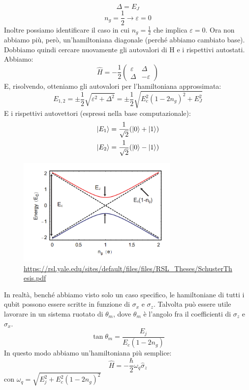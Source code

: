 \begin{equation*}
    \Delta = E_J
\end{equation*}
\begin{equation*}
    n_g=\frac{1}{2} \rightarrow \varepsilon=0
\end{equation*}
Inoltre possiamo identificare il caso in cui $n_g = \frac{1}{2}$ che implica $\varepsilon=0$.
Ora non abbiamo più, però, un'hamiltoniana diagonale (perché abbiamo cambiato base). Dobbiamo quindi cercare nuovamente gli autovalori di H e i rispettivi autostati.
Abbiamo:
\begin{equation*}
    \hat H=-\frac{1}{2}\begin{pmatrix} \varepsilon & \Delta \\ \Delta & -\varepsilon \end{pmatrix}
\end{equation*}
E, risolvendo, otteniamo gli autovalori per l'hamiltoniana approssimata:
\begin{equation*}
    E_{1,2}=\pm \frac 12 \sqrt{\varepsilon^2 + \Delta^2} = \pm \frac 12 \sqrt{E_c^2 (1-2n_g)^2 + E_J^2}
\end{equation*}
E i rispettivi autovettori (espressi nella base computazionale):
\begin{align*}
    \ket{E_1} = \frac{1}{\sqrt{2}}(\ket{0} + \ket{1})\\
    \ket{E_2} = \frac{1}{\sqrt{2}}(\ket{0} - \ket{1})
\end{align*}

\begin{figure}[!htp]
    \centering
    \includegraphics[width=0.7\textwidth]{images/CPB_ng_vs_ec.png}
    \caption{\url{https://rsl.yale.edu/sites/default/files/files/RSL_Theses/SchusterThesis.pdf}}
\end{figure}
\noindent In realtà, benché abbiamo visto solo un caso specifico, le hamiltoniane di tutti i qubit possono essere scritte in funzione di $\sigma_x$ e $\sigma_z$.
Talvolta può essere utile lavorare in un sistema ruotato di $\theta_m$, dove $\theta_m$ è l'angolo fra il coefficienti di $\sigma_z$ e $\sigma_x$.
\begin{equation*}
    \tan \theta_m = \frac{E_j}{E_c(1-2n_g)} 
\end{equation*}
In questo modo abbiamo un'hamiltoniana più semplice:
\begin{equation*}
    \hat H = - \frac{\hbar}{2}\omega_q \hat \sigma_z
\end{equation*}
con $\omega_q = \sqrt{E_j^2 + E_c^2 (1-2n_g)^2}$
